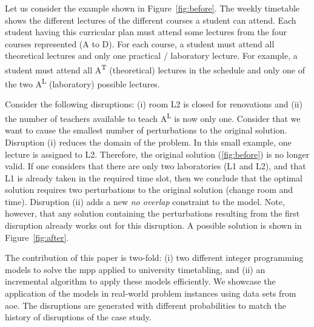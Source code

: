 \documentclass[runningheads]{llncs}
\newcommand{\uni}{\gls{aoe}}
\begin{document}
\begin{example}\label{ex:mov}
Let us consider the example shown in Figure~\ref{fig:before}. The weekly timetable shows the different lectures of the different courses a student can attend. Each student having this curricular plan must attend some lectures from the four courses represented (A to D). For each course, a student must attend all theoretical lectures and only one practical / laboratory lecture. For example, a student must attend all A\textsuperscript{T} (theoretical) lectures in the schedule and only one of the two A\textsuperscript{L} (laboratory) possible lectures. 


Consider the following disruptions: (i) room L2 is closed for renovations and (ii) the number of teachers available to teach A\textsuperscript{L} is now only one. Consider that we want to cause the smallest number of perturbations to the original solution. Disruption (i) reduces the domain of the problem. In this small example, one lecture is assigned to L2. Therefore, the original solution (\ref{fig:before}) is no longer valid. If one considers that there are only two laboratories (L1 and L2), and that L1 is already taken in the required time slot, then we conclude that the optimal solution requires two perturbations to the original solution (change room and time). Disruption (ii) adds a new {\em no overlap} constraint to the model. Note, however, that any solution containing the perturbations resulting from the first disruption already works out for this disruption. A possible solution is shown in Figure~\ref{fig:after}. 
\end{example}





The contribution of this paper is two-fold: (i) two different integer programming models to solve the \gls{mpp} applied to university timetabling, and (ii) an incremental algorithm to apply these models efficiently.   %
We showcase the application of the models in real-world problem instances using data sets from \uni. The disruptions are generated with different probabilities to match the history of disruptions of the case study.
\end{document}
